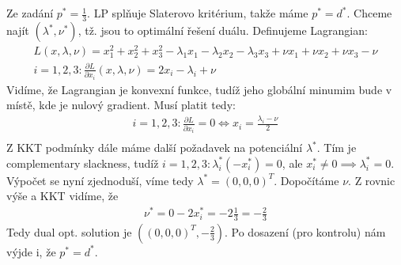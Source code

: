 \documentclass[10pt, a4paper]{article}
\begin{document}
\section{}
Ze zadání $p^* = \frac{1}{3}$. LP splňuje Slaterovo kritérium, takže máme  $p^*=d^*$. Chceme najít $(\lambda^*,\nu^*)$, tž. jsou to optimální řešení duálu. Definujeme Lagrangian:
\begin{gather*}
L(x,\lambda,\nu) = x_1^2+x_2^2+x_3^2-\lambda_1x_1-\lambda_2x_2-\lambda_3x_3+\nu x_1 + \nu x_2 + \nu x_3 - \nu\\
i = 1,2,3: \frac{\partial L}{\partial x_i} (x,\lambda,\nu)=2x_i-\lambda_i+\nu
\end{gather*}
Vidíme, že Lagrangian je konvexní funkce, tudíž jeho globální minumim bude v místě, kde je nulový gradient. Musí platit tedy: 
\begin{gather*}
i = 1,2,3: \frac{\partial L}{\partial x_i} = 0 \iff x_i = \frac{\lambda_i - \nu}{2}\\
\end{gather*}
Z KKT podmínky dále máme další požadavek na potenciální $\lambda^*$. Tím je complementary slackness, tudíž $i=1,2,3: \lambda_i^* (-x_i^*) = 0$, ale $x_i^* \neq 0 \implies \lambda_i^* = 0$. Výpočet se nyní zjednoduší, víme tedy $\lambda^* = (0,0,0)^T$. Dopočítáme $\nu$. Z rovnic výše a KKT vidíme, že 
\begin{gather*}
\nu^* = 0-2x_i^*= -2\frac{1}{3}=-\frac{2}{3}
\end{gather*}
Tedy dual opt. solution je $((0,0,0)^T, -\frac{2}{3})$. Po dosazení (pro kontrolu) nám výjde i, že $p^* = d^*$.
\section{}
\section{}
\end{document}
